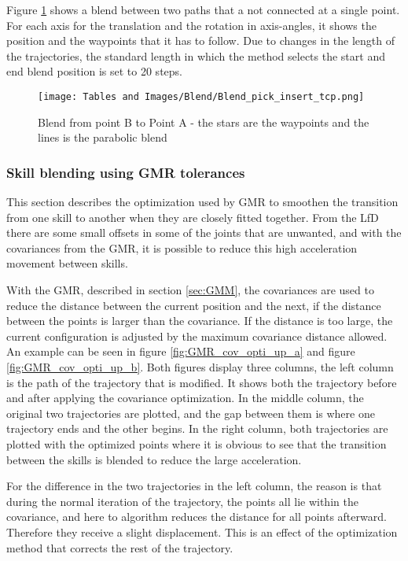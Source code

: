 \documentclass[Setup/main.tex]{subfiles}
\begin{document}
Figure \ref{fig:blend_b_to_as} shows a blend between two paths that a not connected at a single point. For each axis for the translation and the rotation in axis-angles, it shows the position and the waypoints that it has to follow. Due to changes in the length of the trajectories, the standard length in which the method selects the start and end blend position is set to 20 steps. 

\begin{figure}[H]
    \centering
    \texttt{[image: Tables and Images/Blend/Blend\_pick\_insert\_tcp.png]}
    \caption{Blend from point B to Point A - the stars are the waypoints and the lines is the parabolic blend}
    \label{fig:blend_b_to_as}
\end{figure}    

\subsubsection{Skill blending using GMR tolerances} \label{sec:blend:gmr}
This section describes the optimization used by GMR to smoothen the transition from one skill to another when they are closely fitted together. From the LfD there are some small offsets in some of the joints that are unwanted, and with the covariances from the GMR, it is possible to reduce this high acceleration movement between skills.

With the GMR, described in section \ref{sec:GMM}, the covariances are used to reduce the distance between the current position and the next, if the distance between the points is larger than the covariance. If the distance is too large, the current configuration is adjusted by the maximum covariance distance allowed. An example can be seen in figure \ref{fig:GMR_cov_opti_up_a} and figure \ref{fig:GMR_cov_opti_up_b}. Both figures display three columns, the left column is the path of the trajectory that is modified. It shows both the trajectory before and after applying the covariance optimization. In the middle column, the original two trajectories are plotted, and the gap between them is where one trajectory ends and the other begins. In the right column, both trajectories are plotted with the optimized points where it is obvious to see that the transition between the skills is blended to reduce the large acceleration. 

For the difference in the two trajectories in the left column, the reason is that during the normal iteration of the trajectory, the points all lie within the covariance, and here to algorithm reduces the distance for all points afterward. Therefore they receive a slight displacement. This is an effect of the optimization method that corrects the rest of the trajectory.
\end{document}
